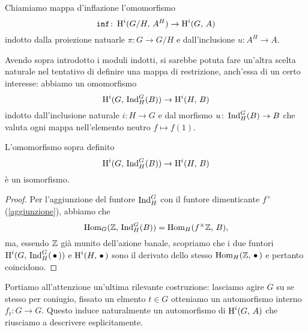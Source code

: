 \begin{definition}[Inflazione]
	Chiamiamo mappa d'inflazione l'omomorfismo
	\[ \operatorname{\texttt{inf}} \colon \operatorname{H}^i(G/H, \, A^H) \to \operatorname{H}^i(G, \, A) \]
	indotto dalla proiezione natuarle $ \pi \colon G \to G/H $ e dall'inclusione $ u \colon A^H \to A $.
\end{definition}

Avendo sopra introdotto i moduli indotti, si sarebbe potuta fare un'altra scelta naturale nel tentativo di definire una mappa di restrizione, anch'essa di un certo interesse: abbiamo un omomorfismo \[ \operatorname{H}^i(G, \, \operatorname{Ind}_H^G(B)) \to \operatorname{H}^i(H, \, B) \] indotto dall'inclusione naturale $ i \colon H \to G $ e dal morfismo $ u \colon \operatorname{Ind}_H^G(B) \to B $ che valuta ogni mappa nell'elemento neutro $ f \mapsto f(1) $. 
\begin{proposition}
	L'omomorfismo sopra definito
	\[ \operatorname{H}^i(G, \, \operatorname{Ind}_H^G(B)) \to \operatorname{H}^i(H, \, B) \]
	è un isomorfismo.
\end{proposition}
\begin{proof}
	Per l'aggiunzione del funtore $ \operatorname{Ind}_H^G $ con il funtore dimenticante $ f^\times $ (\ref{aggiunzione}), abbiamo che
	\[ \operatorname{Hom}_G(\mathbb{Z},\, \operatorname{Ind}_H^G(B)) = \operatorname{Hom}_H(f^\times \mathbb{Z}, \, B), \]
	ma, essendo $ \mathbb{Z} $ già munito dell'azione banale, scopriamo che i due funtori $ \operatorname{H}^i(G, \, \operatorname{Ind}_H^G(\,\bullet\,)) $ e $ \operatorname{H}^i(H, \, \bullet\,) $ sono il derivato dello stesso $ \operatorname{Hom}_H(\mathbb{Z}, \,\bullet \,) $ e pertanto coincidono.
\end{proof}

Portiamo all'attenzione un'ultima rilevante costruzione: lasciamo agire $ G $ su se stesso per coniugio, fissato un elmento $ t \in G $ otteniamo un automorfismo interno $ f_t \colon G \to G $. Questo induce naturalmente un automorfismo di $ \operatorname{H}^i(G, \, A) $ che riusciamo a descrivere esplicitamente.


